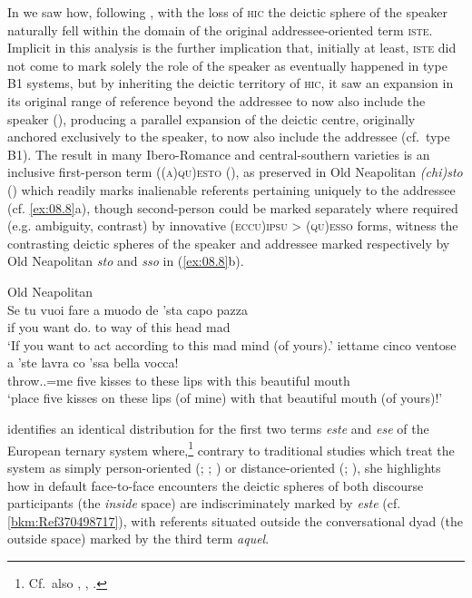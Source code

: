 \documentclass[output=paper]{langsci/langscibook}
\begin{document}
In  we saw how, following \citet{Vincent:1999ab}, with the
loss of \textsc{hic} the deictic sphere of the speaker naturally fell within
the domain of the original addressee-oriented term \textsc{iste}. Implicit in
this analysis is the further implication that, initially at least,
\textsc{iste} did not come to mark solely the role of the speaker as eventually
happened in type B1 systems, but by inheriting the deictic territory
of \textsc{hic,} it saw an expansion in its original range of reference beyond
the addressee to now also include the speaker
(\citealt[91--96]{ledgeway2004sviluppo}), producing a parallel expansion of the
deictic centre, originally anchored exclusively to the speaker, to now also
include the addressee (cf.\ type B1). The result in many Ibero-Romance
and central-southern  varieties is an inclusive first-person term
\textsc{((a)qu)esto} (\citealt[78--91]{ledgeway2004sviluppo}), as preserved in
Old Neapolitan \emph{(chi)sto} (\citealt[200--205]{Ledgeway:2009a}) which
readily marks inalienable referents pertaining uniquely to the addressee (cf.
\ref{ex:08.8}a), though second-person  could be marked separately where required
(e.g. ambiguity, contrast) by innovative (\textsc{eccu})\textsc{ipsu} >
\textsc{(qu)esso} forms, witness the contrasting deictic spheres of the speaker
and addressee marked respectively by Old Neapolitan \emph{sto} and \emph{sso}
in (\ref{ex:08.8}b).

\ea Old Neapolitan \citep{Ledgeway:2009a}\label{ex:08.8}\\
    \ea
    \gll  Se  tu  vuoi  fare  a  muodo  de  ’sta  capo  pazza\\
          if  you  want  do.\Inf{}  to  way  of  this  head  mad\\
    \glt    \enquote*{If you want to act according to this mad mind (of yours).}
    \ex
    \gll  iettame  cinco  ventose  a  ’ste  lavra  co ’ssa  bella  vocca!\\
             throw.\Imp{}.\Ssg{}=me  five  kisses  to  these  lips  with this  beautiful  mouth\\
    \glt \enquote*{place five kisses on these lips (of mine) with that beautiful mouth (of
    yours)!}
    \z
\z

\citet{Jungbluth:2003a,Jungbluth:2017a} identifies an identical distribution
for the first two terms \emph{este} and \emph{ese} of the European 
ternary system where,\footnote{Cf.\ also
    \citet{Gutierrez-Rexach:2002a,Gutierrez-Rexach:2005a},
    \citet[52]{Langacker:1990a},
\citet[245--247]{Gomez-Sanchez:2015a}.\label{fn:08.4}}
    contrary to traditional studies which treat the system as simply
    person-oriented (\citealt[109, 581, 585]{:1970a};
    \citealt[940]{Eguren:1999a}; \citealt[557]{Eguren:2012a}) or
    distance-oriented (\citealt{Hottenroth:1992a};
    \citealt[39]{Diessel1999}), she highlights how in default face-to-face
    encounters the deictic spheres of both discourse participants (the
    \emph{inside} space) are indiscriminately marked by \emph{este} (cf.
    \ref{bkm:Ref370498717}), with referents situated outside the conversational dyad (the
    outside space) marked by the third term \emph{aquel}.\newpage
\end{document}
